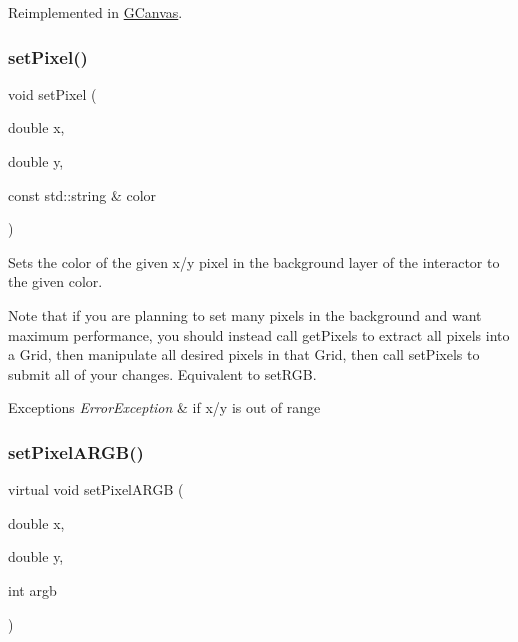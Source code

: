 Reimplemented in \mbox{\hyperlink{classGCanvas_a92c3e3ef930ae7742ad384af28aac241}{G\+Canvas}}.

\mbox{\label{classGDrawingSurface_a09f9640e4ff7388dcfc391efd88d2415}} 
\subsubsection{\texorpdfstring{set\+Pixel()}{setPixel()}\hspace{0.1cm}{\footnotesize\ttfamily [3/3]}}
{\footnotesize\ttfamily void set\+Pixel (\begin{DoxyParamCaption}\item[{double}]{x,  }\item[{double}]{y,  }\item[{const std\+::string \&}]{color }\end{DoxyParamCaption})\hspace{0.3cm}{\ttfamily [virtual]}}



Sets the color of the given x/y pixel in the background layer of the interactor to the given color. 

Note that if you are planning to set many pixels in the background and want maximum performance, you should instead call get\+Pixels to extract all pixels into a Grid, then manipulate all desired pixels in that Grid, then call set\+Pixels to submit all of your changes. Equivalent to set\+R\+GB.


\begin{DoxyExceptions}{Exceptions}
{\em Error\+Exception} & if x/y is out of range \\
\hline
\end{DoxyExceptions}
\mbox{\label{classGDrawingSurface_ab2f7c5a9462f552ad3f30d23c04605dd}} 
\subsubsection{\texorpdfstring{set\+Pixel\+A\+R\+G\+B()}{setPixelARGB()}\hspace{0.1cm}{\footnotesize\ttfamily [1/2]}}
{\footnotesize\ttfamily virtual void set\+Pixel\+A\+R\+GB (\begin{DoxyParamCaption}\item[{double}]{x,  }\item[{double}]{y,  }\item[{int}]{argb }\end{DoxyParamCaption})\hspace{0.3cm}{\ttfamily [pure virtual]}}



